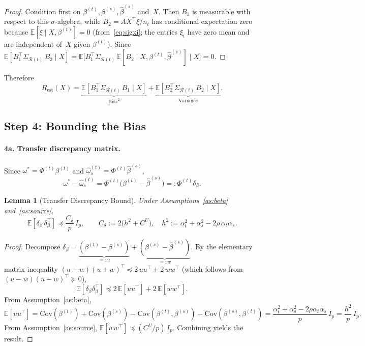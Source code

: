 \documentclass[11pt]{article}
\newtheorem{lemma}[theorem]{Lemma}
\theoremstyle{definition}
\newcommand{\Rt}{\mathcal{R}(t)}
\newcommand{\SigR}{\Sigma_{\Rt}}
\newcommand{\bhat}{\hat{\beta}}
\newcommand{\ohat}{\hat{\omega}}
\newcommand{\E}{\mathbb{E}}
\newcommand{\Cov}{\mathrm{Cov}}
\begin{document}
\begin{proof}
Condition first on $\beta^{(t)},\beta^{(s)},\bhat^{(s)}$ and~$X$.
Then $B_1$ is measurable with respect to this $\sigma$-algebra,
while $B_2=AX^\top\xi/n_t$ has conditional expectation zero because
$\E[\xi\mid X,\beta^{(t)}]=0$ (from~\eqref{eq:sigxi}; the
entries $\xi_i$ have zero mean and are independent of~$X$ given
$\beta^{(t)}$).  Since
$\E[B_1^\top\SigR\,B_2\mid X]
=\E\bigl[B_1^\top\SigR\,
\E[B_2\mid X,\beta^{(t)},\bhat^{(s)}]\;\big|\;X\bigr]=0$.
\end{proof}
 
Therefore
\begin{equation}\label{eq:Rest}
  R_{\mathrm{est}}(X)
  =\underbrace{\E[B_1^\top\SigR\,B_1\mid X]}_{
    \displaystyle\text{Bias}^2}
  +\underbrace{\E[B_2^\top\SigR\,B_2\mid X]}_{
    \displaystyle\text{Variance}}.
\end{equation}
 
\subsection{Step 4: Bounding the Bias}\label{sec:step4}
 
\paragraph{4a.  Transfer discrepancy matrix.}
Since $\omega^*=\Phi^{(t)}\beta^{(t)}$ and
$\ohat_s^{(t)}=\Phi^{(t)}\bhat^{(s)}$,
\[
  \omega^*-\ohat_s^{(t)}
  =\Phi^{(t)}\bigl(\beta^{(t)}-\bhat^{(s)}\bigr)
  =:\Phi^{(t)}\delta_\beta.
\]
 
\begin{lemma}[Transfer Discrepancy Bound]\label{lem:Cdelta}
Under Assumptions~\ref{as:beta} and~\ref{as:source},
\[
  \E[\delta_\beta\,\delta_\beta^\top]
  \preceq \frac{C_\delta}{p}\,I_p,
  \qquad
  C_\delta:=2\bigl(h^2+C^U\bigr),
  \quad
  h^2:=\alpha_t^2+\alpha_s^2-2\rho\,\alpha_t\alpha_s.
\]
\end{lemma}
 
\begin{proof}
Decompose
$\delta_\beta=\underbrace{(\beta^{(t)}-\beta^{(s)})}_{=:u}
+\underbrace{(\beta^{(s)}-\bhat^{(s)})}_{=:w}$.
By the elementary matrix inequality
$(u+w)(u+w)^\top\preceq 2\,uu^\top+2\,ww^\top$ (which follows from
$(u-w)(u-w)^\top\succeq 0$),
\[
  \E[\delta_\beta\delta_\beta^\top]
  \preceq
  2\,\E[uu^\top]+2\,\E[ww^\top].
\]
From Assumption~\ref{as:beta},
\[
  \E[uu^\top]
  =\Cov(\beta^{(t)})+\Cov(\beta^{(s)})
  -\Cov(\beta^{(t)},\beta^{(s)})
  -\Cov(\beta^{(s)},\beta^{(t)})
  =\frac{\alpha_t^2+\alpha_s^2-2\rho\alpha_t\alpha_s}{p}\,I_p
  =\frac{h^2}{p}\,I_p.
\]
From Assumption~\ref{as:source},
$\E[ww^\top]\preceq (C^U/p)\,I_p$.  Combining yields the result.
\end{proof}
 
\end{document}
